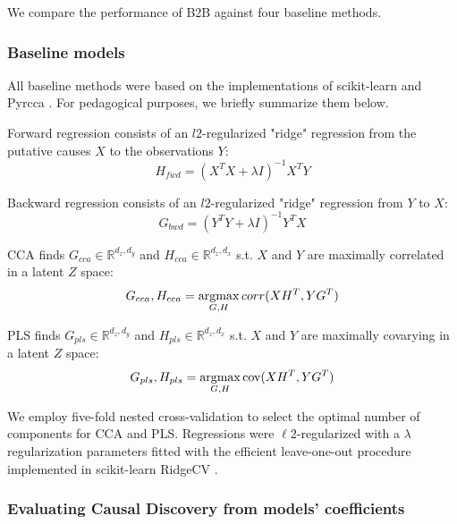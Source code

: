 We compare the performance of B2B against four baseline methods.
%

\subsubsection{Baseline models}

All baseline methods were based on the implementations of scikit-learn \citep{sklearn} and Pyrcca
\citep{bilenko2016Pyrcca}. For pedagogical purposes, we briefly summarize them below.

Forward regression consists of an $l2$-regularized "ridge" regression from the
putative causes $X$ to the observations $Y$: \begin{equation} H_{fwd} = (X^T X
+\lambda I)^{-1} X^T Y \end{equation}

Backward regression consists of an $l2$-regularized "ridge" regression from $Y$
to $X$: \begin{equation} G_{bwd} = (Y^T Y +\lambda I)^{-1} Y^T X \end{equation}

CCA finds $G_{cca}\in\mathbb{R}^{d_z, d_y}$ and $H_{cca}\in\mathbb{R}^{d_z, d_x}$
s.t.
$X$ and $Y$ are maximally correlated in a latent $Z$ space:
\begin{equation} G_{cca},H_{cca} = \operatorname*{argmax}_{G,H} corr(XH^T, YG^T) \end{equation}

PLS finds $G_{pls}\in\mathbb{R}^{d_z, d_y}$ and $H_{pls}\in\mathbb{R}^{d_z, d_x}$
s.t.
$X$ and $Y$ are maximally covarying in a latent $Z$ space:
\begin{equation} G_{pls},H_{pls} = \operatorname*{argmax}_{G,H} \text{cov}(XH^T, YG^T) \end{equation}

We employ five-fold nested cross-validation to select the optimal number of components
for CCA and PLS. Regressions were $\ell2$-regularized with a $\lambda$ regularization
parameters fitted with the efficient leave-one-out procedure implemented in
scikit-learn RidgeCV \citep{sklearn}.

\subsubsection{Evaluating Causal Discovery from models' coefficients}

